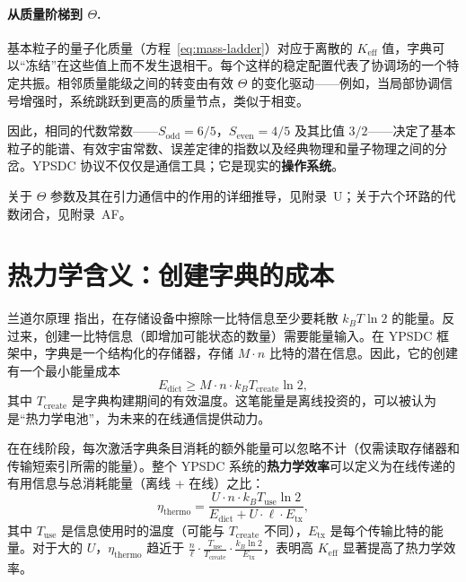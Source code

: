 \documentclass[12pt,a4paper]{article}
\theoremstyle{remark}
\newcommand{\Keff}{K_{\mathrm{eff}}}
\begin{document}
	\paragraph{从质量阶梯到 \(\Theta\).}
	基本粒子的量子化质量（方程~\ref{eq:mass-ladder}）对应于离散的 \(K_{\mathrm{eff}}\) 值，字典可以“冻结”在这些值上而不发生退相干。每个这样的稳定配置代表了协调场的一个特定共振。相邻质量能级之间的转变由有效 \(\Theta\) 的变化驱动——例如，当局部协调信号增强时，系统跳跃到更高的质量节点，类似于相变。
	
	因此，相同的代数常数——\(S_{\mathrm{odd}} = 6/5\)，\(S_{\mathrm{even}} = 4/5\) 及其比值 \(3/2\)——决定了基本粒子的能谱、有效宇宙常数、误差定律的指数以及经典物理和量子物理之间的分岔。YPSDC 协议不仅仅是通信工具；它是现实的\textbf{操作系统}。
	
	关于 \(\Theta\) 参数及其在引力通信中的作用的详细推导，见附录~U；关于六个环路的代数闭合，见附录~AF。
	
	\section{热力学含义：创建字典的成本}
	\label{sec:thermo}
	
	兰道尔原理 \cite{Landauer1961} 指出，在存储设备中擦除一比特信息至少要耗散 $k_B T \ln 2$ 的能量。反过来，创建一比特信息（即增加可能状态的数量）需要能量输入。在 YPSDC 框架中，字典是一个结构化的存储器，存储 $M \cdot n$ 比特的潜在信息。因此，它的创建有一个最小能量成本
	\begin{equation}
		E_{\text{dict}} \ge M \cdot n \cdot k_B T_{\text{create}} \ln 2, \label{eq:thermo-cost}
	\end{equation}
	其中 $T_{\text{create}}$ 是字典构建期间的有效温度。这笔能量是离线投资的，可以被认为是“热力学电池”，为未来的在线通信提供动力。
	
	在在线阶段，每次激活字典条目消耗的额外能量可以忽略不计（仅需读取存储器和传输短索引所需的能量）。整个 YPSDC 系统的\textbf{热力学效率}可以定义为在线传递的有用信息与总消耗能量（离线 + 在线）之比：
	\begin{equation}
		\eta_{\text{thermo}} = \frac{U \cdot n \cdot k_B T_{\text{use}} \ln 2}{E_{\text{dict}} + U \cdot \ell \cdot E_{\text{tx}}}, \label{eq:thermo}
	\end{equation}
	其中 $T_{\text{use}}$ 是信息使用时的温度（可能与 $T_{\text{create}}$ 不同），$E_{\text{tx}}$ 是每个传输比特的能量。对于大的 $U$，$\eta_{\text{thermo}}$ 趋近于 $\frac{n}{\ell} \cdot \frac{T_{\text{use}}}{T_{\text{create}}} \cdot \frac{k_B \ln 2}{E_{\text{tx}}}$，表明高 $\Keff$ 显著提高了热力学效率。
	
\end{document}
